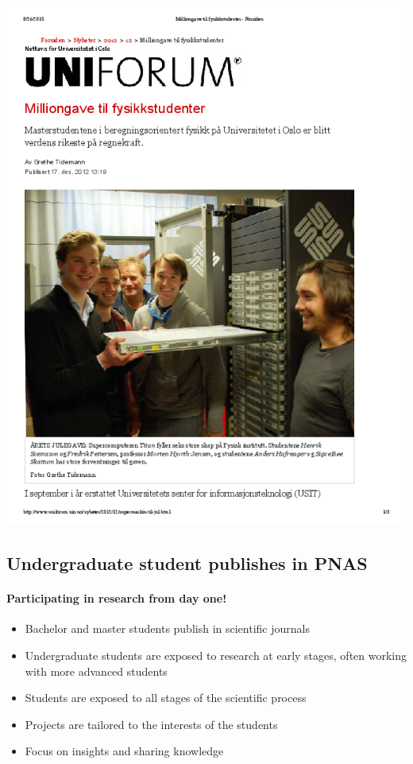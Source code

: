 \documentclass[%
twoside,                 %
final,                   %
10pt]{article}
\begin{document}
\noindent





\centerline{\includegraphics[width=1.0\linewidth]{fig-future/uniforum-0.png}}




\subsection*{Undergraduate student publishes in PNAS}

\paragraph{Participating in research from day one!}
\begin{itemize}
\item Bachelor and master students publish in scientific journals 

\item Undergraduate students are exposed to research at early stages, often working with more advanced students

\item Students are exposed to all stages of the scientific process

\item Projects are tailored to the interests of the students

\item Focus on insights and sharing knowledge
\end{itemize}
\end{document}
